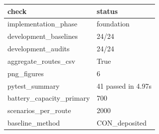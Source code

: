 \begin{tabular}{ll}
 \hline
 check & status \\
 \hline
 implementation_phase & foundation \\
 development_baselines & 24/24 \\
 development_audits & 24/24 \\
 aggregate_routes_csv & True \\
 png_figures & 6 \\
 pytest_summary & 41 passed in 4.97s \\
 battery_capacity_primary & 700 \\
 scenarios_per_route & 2000 \\
 baseline_method & CON_deposited \\
 \hline
\end{tabular}
